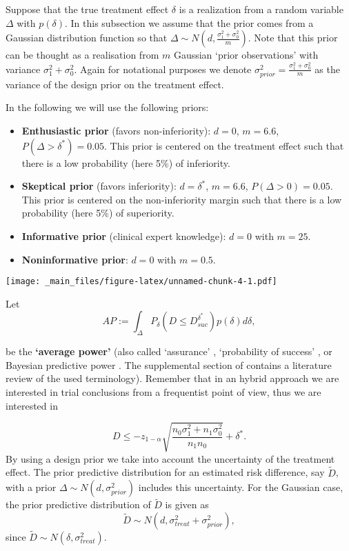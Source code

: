 \documentclass[
]{book}
\providecommand{\tightlist}{%
  \setlength{\itemsep}{0pt}\setlength{\parskip}{0pt}}
\begin{document}
Suppose that the true treatment effect \(\delta\) is a realization from a random variable \(\Delta\) with \(p(\delta)\). In this subsection we assume that the prior comes from a Gaussian distribution function so that \(\Delta \sim N\left(d, \frac{\sigma_1^2+\sigma_0^2}{m}\right)\). Note that this prior can be thought as a realisation from \(m\) Gaussian `prior observations' with variance \(\sigma_1^2+\sigma_0^2\). Again for notational purposes we denote \(\sigma_{prior}^2=\frac{\sigma_1^2+\sigma_0^2}{m}\) as the variance of the design prior on the treatment effect.

In the following we will use the following priors:

\begin{itemize}
\tightlist
\item
  \textbf{Enthusiastic prior} (favors non-inferiority): \(d=0\), \(m=6.6\), \(P(\Delta>\delta^*)=0.05\). This prior is centered on the treatment effect such that there is a low probability (here 5\%) of inferiority.
\item
  \textbf{Skeptical prior} (favors inferiority): \(d=\delta^*\), \(m=6.6\), \(P(\Delta>0)=0.05\). This prior is centered on the non-inferiority margin such that there is a low probability (here 5\%) of superiority.
\item
  \textbf{Informative prior} (clinical expert knowledge): \(d=0\) with \(m=25\).
\item
  \textbf{Noninformative prior}: \(d=0\) with \(m=0.5\).
\end{itemize}

\texttt{[image: \_main\_files/figure-latex/unnamed-chunk-4-1.pdf]}

Let
\[
AP:=\int_{\Delta} P_{\delta}(D\leq D_{suc}^{\delta^*})p(\delta)d\delta,
\]

be the \textbf{`average power'} \citet{Grieve2022} (also called `assurance' \citet{OHagan2005}, `probability of success' \citet{Kunzmann2022}, \citet{Spiegelhalter2003} or Bayesian predictive power \citet{Rufibach2016}. The supplemental section of \citet{Kunzmann2022} contains a literature review of the used terminology). Remember that in an hybrid approach we are interested in trial conclusions from a frequentist point of view, thus we are interested in

\[
D\leq -z_{1-\alpha}\sqrt{\frac{n_0\sigma_1^2+n_1\sigma_0^2}{n_1n_0}}+\delta^*.
\]
By using a design prior we take into account the uncertainty of the treatment effect. The prior predictive distribution for an estimated risk difference, say \(\tilde D\), with a prior \(\Delta \sim N\left(d, \sigma_{prior}^2\right)\) includes this uncertainty. For the Gaussian case, the prior predictive distribution of \(\tilde D\) is given as
\[
\tilde D \sim N\left(d, \sigma_{treat}^2+\sigma_{prior}^2\right),
\]
since \(\tilde D \sim N\left(\delta, \sigma_{treat}^2\right)\).
\end{document}
